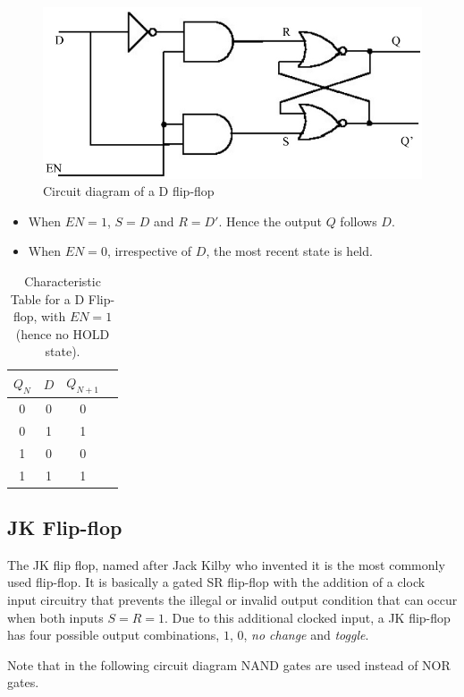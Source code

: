 \begin{figure}[H]
    \centering
    \includegraphics[width=0.60\columnwidth]{images/d.jpg}
    \caption{Circuit diagram of a D flip-flop}
    \label{3}
\end{figure}

\begin{itemize}
    \item When $EN=1$, $S=D$ and $R=D'$. Hence the output $Q$ follows $D$.
    \item When $EN=0$, irrespective of $D$, the most recent state is held. 
\end{itemize}

\begin{table}[H]
    \centering
    \begin{tabular}{|c|c|c|c|}\hline
        $Q_N$ & $D$ & $Q_{N+1}$ \\ \hline
        0 & 0 & 0 \\ 
        0 & 1 & 1 \\ 
        1 & 0 & 0 \\ 
        1 & 1 & 1 \\ \hline
    \end{tabular}
    \caption{Characteristic Table for a D Flip-flop, with $EN=1$ (hence no HOLD state).}
\end{table}


\subsection*{JK Flip-flop}
The JK flip flop, named after Jack Kilby who invented it is
the most commonly used flip-flop.
It is basically a gated SR flip-flop with the addition of a clock input circuitry that prevents the illegal or invalid output condition that can occur when both inputs $S=R=1$. Due to this additional clocked input, a JK flip-flop has four possible output combinations, $1$, $0$, \textit{no change} and \textit{toggle}.

Note that in the following circuit diagram NAND gates are used instead of NOR gates.

